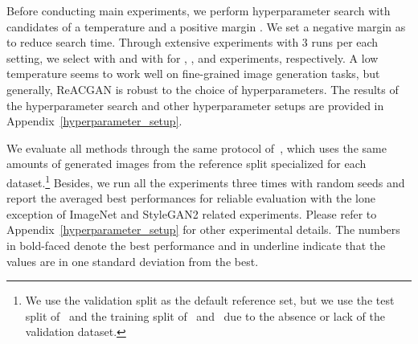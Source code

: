 \documentclass{article}
\begin{document}
Before conducting main experiments, we perform hyperparameter search with candidates of a temperature  and a positive margin . We set a negative margin  as  to reduce search time. Through extensive experiments with 3 runs per each setting, we select  with  and  with  for , , and  experiments, respectively.
A low temperature seems to work well on fine-grained image generation tasks, but generally, ReACGAN is robust to the choice of hyperparameters. The results of the hyperparameter search and other hyperparameter setups are provided in Appendix~\ref{hyperparameter_setup}. 

We evaluate all methods through the same protocol of~\cite{zhao2020differentiable, Zhang2019ConsistencyRF, Zhao2020ImprovedCR}, which uses the same amounts of generated images from the reference split specialized for each dataset.\footnote{We use the validation split as the default reference set, but we use the test split of~ and the training split of~ and~ due to the absence or lack of the validation dataset.} Besides, we run all the experiments three times with random seeds and report the averaged best performances for reliable evaluation with the lone exception of ImageNet and StyleGAN2 related experiments. Please refer to Appendix~\ref{hyperparameter_setup} for other experimental details. The numbers in bold-faced denote the best performance and in underline indicate that the values are in one standard deviation from the best.
\end{document}
